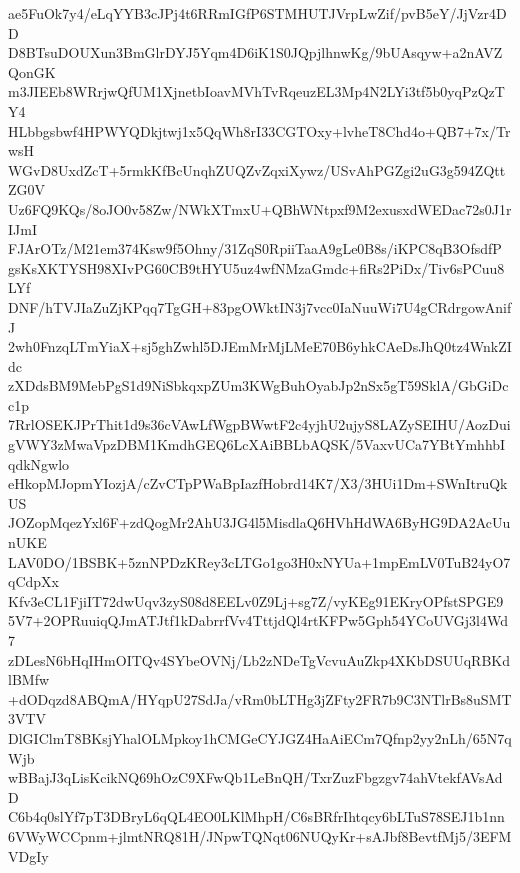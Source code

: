 ae5FuOk7y4/eLqYYB3cJPj4t6RRmIGfP6STMHUTJVrpLwZif/pvB5eY/JjVzr4DD
D8BTsuDOUXun3BmGlrDYJ5Yqm4D6iK1S0JQpjlhnwKg/9bUAsqyw+a2nAVZQonGK
m3JIEEb8WRrjwQfUM1XjnetbIoavMVhTvRqeuzEL3Mp4N2LYi3tf5b0yqPzQzTY4
HLbbgsbwf4HPWYQDkjtwj1x5QqWh8rI33CGTOxy+lvheT8Chd4o+QB7+7x/TrwsH
WGvD8UxdZcT+5rmkKfBcUnqhZUQZvZqxiXywz/USvAhPGZgi2uG3g594ZQttZG0V
Uz6FQ9KQs/8oJO0v58Zw/NWkXTmxU+QBhWNtpxf9M2exusxdWEDac72s0J1rIJmI
FJArOTz/M21em374Ksw9f5Ohny/31ZqS0RpiiTaaA9gLe0B8s/iKPC8qB3OfsdfP
gsKsXKTYSH98XIvPG60CB9tHYU5uz4wfNMzaGmdc+fiRs2PiDx/Tiv6sPCuu8LYf
DNF/hTVJIaZuZjKPqq7TgGH+83pgOWktIN3j7vcc0IaNuuWi7U4gCRdrgowAnifJ
2wh0FnzqLTmYiaX+sj5ghZwhl5DJEmMrMjLMeE70B6yhkCAeDsJhQ0tz4WnkZIdc
zXDdsBM9MebPgS1d9NiSbkqxpZUm3KWgBuhOyabJp2nSx5gT59SklA/GbGiDcc1p
7RrlOSEKJPrThit1d9s36cVAwLfWgpBWwtF2c4yjhU2ujyS8LAZySEIHU/AozDui
gVWY3zMwaVpzDBM1KmdhGEQ6LcXAiBBLbAQSK/5VaxvUCa7YBtYmhhbIqdkNgwlo
eHkopMJopmYIozjA/cZvCTpPWaBpIazfHobrd14K7/X3/3HUi1Dm+SWnItruQkUS
JOZopMqezYxl6F+zdQogMr2AhU3JG4l5MisdlaQ6HVhHdWA6ByHG9DA2AcUunUKE
LAV0DO/1BSBK+5znNPDzKRey3cLTGo1go3H0xNYUa+1mpEmLV0TuB24yO7qCdpXx
Kfv3eCL1FjiIT72dwUqv3zyS08d8EELv0Z9Lj+sg7Z/vyKEg91EKryOPfstSPGE9
5V7+2OPRuuiqQJmATJtf1kDabrrfVv4TttjdQl4rtKFPw5Gph54YCoUVGj3l4Wd7
zDLesN6bHqIHmOITQv4SYbeOVNj/Lb2zNDeTgVcvuAuZkp4XKbDSUUqRBKdlBMfw
+dODqzd8ABQmA/HYqpU27SdJa/vRm0bLTHg3jZFty2FR7b9C3NTlrBs8uSMT3VTV
DlGIClmT8BKsjYhalOLMpkoy1hCMGeCYJGZ4HaAiECm7Qfnp2yy2nLh/65N7qWjb
wBBajJ3qLisKcikNQ69hOzC9XFwQb1LeBnQH/TxrZuzFbgzgv74ahVtekfAVsAdD
C6b4q0slYf7pT3DBryL6qQL4EO0LKlMhpH/C6sBRfrIhtqcy6bLTuS78SEJ1b1nn
6VWyWCCpnm+jlmtNRQ81H/JNpwTQNqt06NUQyKr+sAJbf8BevtfMj5/3EFMVDgIy

